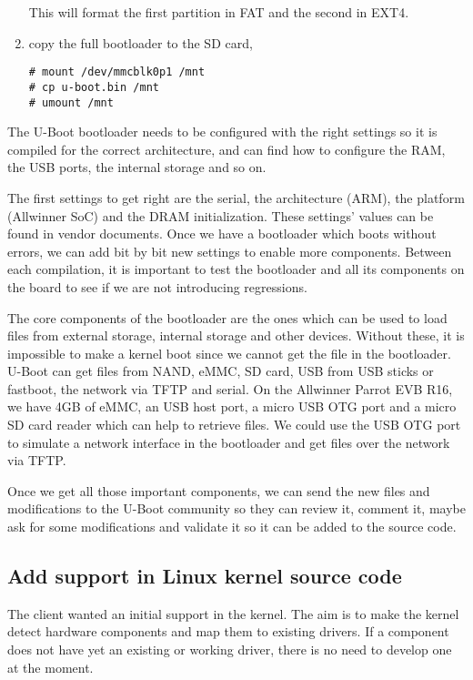 \begin{enumerate}
This will format the first partition in FAT and the second in EXT4.

  \item copy the full bootloader to the SD card,

\begin{verbatim}
# mount /dev/mmcblk0p1 /mnt
# cp u-boot.bin /mnt
# umount /mnt
\end{verbatim}
\end{enumerate}

The U-Boot bootloader needs to be configured with the right settings so it is compiled for the correct architecture, and can find how to configure the RAM, the USB ports, the internal storage and so on.

The first settings to get right are the serial, the architecture (ARM), the platform (Allwinner SoC) and the DRAM initialization. These settings' values can be found in vendor documents. Once we have a bootloader which boots without errors, we can add bit by bit new settings to enable more components. Between each compilation, it is important to test the bootloader and all its components on the board to see if we are not introducing regressions.

The core components of the bootloader are the ones which can be used to load files from external storage, internal storage and other devices. Without these, it is impossible to make a kernel boot since we cannot get the file in the bootloader. U-Boot can get files from NAND, eMMC, SD card, USB from USB sticks or fastboot, the network via TFTP and serial. On the Allwinner Parrot EVB R16, we have 4GB of eMMC, an USB host port, a micro USB OTG port and a micro SD card reader which can help to retrieve files. We could use the USB OTG port to simulate a network interface in the bootloader and get files over the network via TFTP.

Once we get all those important components, we can send the new files and modifications to the U-Boot community so they can review it, comment it, maybe ask for some modifications and validate it so it can be added to the source code.

\subsection{Add support in Linux kernel source code}

The client wanted an initial support in the kernel. The aim is to make the kernel detect hardware components and map them to existing drivers. If a component does not have yet an existing or working driver, there is no need to develop one at the moment.

